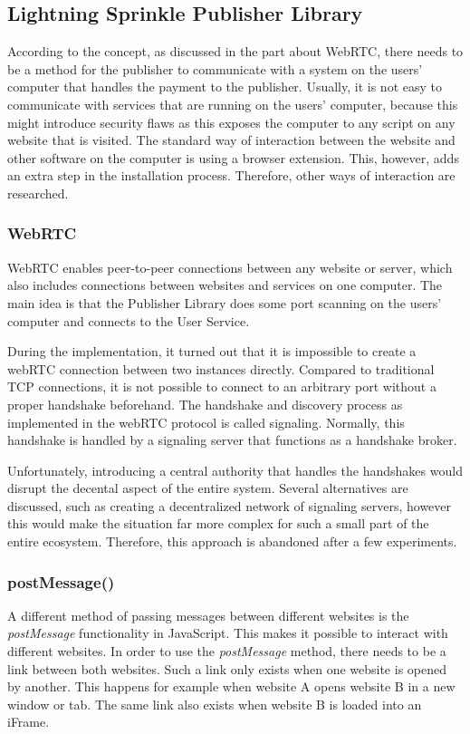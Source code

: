 \subsection{Lightning Sprinkle Publisher Library}
According to the concept, as discussed in the part about WebRTC, there needs to be a method for the publisher to communicate with a system on the users' computer that handles the payment to the publisher. Usually, it is not easy to communicate with services that are running on the users' computer, because this might introduce security flaws as this exposes the computer to any script on any website that is visited. The standard way of interaction between the website and other software on the computer is using a browser extension. This, however, adds an extra step in the installation process. Therefore, other ways of interaction are researched.

\subsubsection{WebRTC}

WebRTC enables peer-to-peer connections between any website or server, which also includes connections between websites and services on one computer. The main idea is that the Publisher Library does some port scanning on the users' computer and connects to the User Service.

During the implementation, it turned out that it is impossible to create a webRTC connection between two instances directly. Compared to traditional TCP connections, it is not possible to connect to an arbitrary port without a proper handshake beforehand. The handshake and discovery process as implemented in the webRTC protocol is called signaling. Normally, this handshake is handled by a signaling server that functions as a handshake broker.

Unfortunately, introducing a central authority that handles the handshakes would disrupt the decental aspect of the entire system. Several alternatives are discussed, such as creating a decentralized network of signaling servers, however this would make the situation far more complex for such a small part of the entire ecosystem. Therefore, this approach is abandoned after a few experiments.

\subsubsection{postMessage()}
A different method of passing messages between different websites is the \textit{postMessage} functionality in JavaScript. This makes it possible to interact with different websites. In order to use the \textit{postMessage} method, there needs to be a link between both websites. Such a link only exists when one website is opened by another. This happens for example when website A opens website B in a new window or tab. The same link also exists when website B is loaded into an iFrame. 

